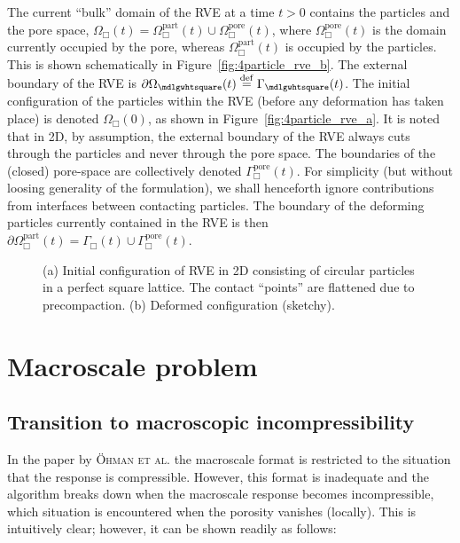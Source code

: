 \documentclass[10pt,a4paper]{article}
\renewcommand{\Box}{\mdlgwhtsquare}
\newcommand{\figref}[1]{Figure~\ref{#1}}
\newcommand{\pore}{\mathrm{pore}}
\newcommand{\particle}{\mathrm{part}}
\begin{document}
The current ``bulk'' domain of the RVE at a time $t>0$ contains the particles and the pore space, $\Omega_\Box(t)=\Omega^\particle_\Box(t)\cup\Omega_\Box^\pore(t)$, where $\Omega_\Box^\pore(t)$ is the domain currently occupied by the pore, whereas $\Omega_\Box^\particle(t)$ is occupied by the particles. This is shown schematically in \figref{fig:4particle_rve_b}.
The external boundary of the RVE is $\partial\Omega_\Box(t)\defeq\Gamma_\Box(t)$. The initial configuration of the particles within the RVE (before any deformation has taken place) is denoted $\Omega_\Box(0)$, as shown in \figref{fig:4particle_rve_a}. It is noted that in 2D, by assumption, the external boundary of the RVE always cuts through the particles and never through the pore space. The boundaries of the (closed) pore-space are collectively denoted $\Gamma_\Box^\pore(t)$. For simplicity (but without loosing generality of the formulation), we shall henceforth ignore contributions from interfaces between contacting particles. The boundary of the deforming particles currently contained in the RVE is then $\partial\Omega^\particle_\Box(t)=\Gamma_\Box(t)\cup\Gamma_\Box^\pore(t)$.
\begin{figure}[th!]
    \centering
    \subfloat[$t = 0$]{\label{fig:4particle_rve_a}}
    \subfloat[$t > 0$]{\label{fig:4particle_rve_b}}
    \caption{(a) Initial configuration of RVE in 2D consisting of circular particles in a perfect square lattice. The contact ``points'' are flattened due to precompaction. (b) Deformed configuration (sketchy).}
    \label{fig:4particleRVE}
\end{figure}

\section{Macroscale problem}\label{sec:macro}

\subsection{Transition to macroscopic incompressibility}

In the paper by \textsc{Öhman et al.} \cite{OhmanRunLar2011} the macroscale format is restricted to the situation that the response is compressible. However, this format is inadequate and the algorithm breaks down when the macroscale response becomes incompressible, which situation is encountered when the porosity vanishes (locally). This is intuitively clear; however, it can be shown readily as follows:
\end{document}
